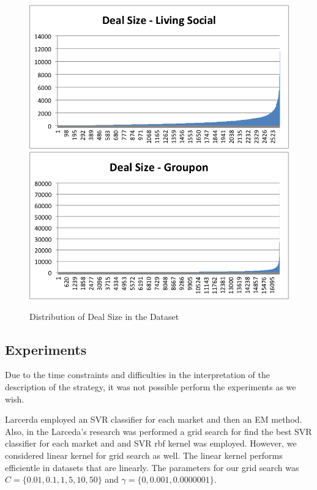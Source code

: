 \documentclass{acm_proc_article-sp}
\begin{document}
\begin{figure}[H]
    \centering
    \includegraphics[scale=0.5]{dealsizels.png}
    \includegraphics[scale=0.5]{dealsizegroupon.png}
    \caption{Distribution of Deal Size in the Dataset}
    \label{dealsize}
\end{figure}


\subsection{Experiments}

Due to the time constraints and difficulties in the interpretation of 
the description of the strategy, it was not possible perform the 
experiments as we wish. 

Larcerda employed an SVR classifier for each market and then 
an EM method. Also, in the Larceda's research was performed 
a grid search for find the best SVR classifier for each market and 
and SVR rbf kernel was employed. However, we considered linear 
kernel for grid search as well. The linear kernel performs  
efficientle in datasets that are linearly. The parameters for 
our grid search was $C = \{0.01,0.1,$$1,5,10,50\}$ and 
$\gamma = \{0,0.001,0.0000001\}$.
\end{document}
